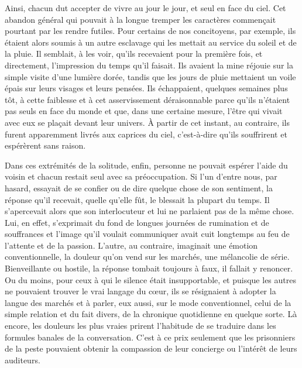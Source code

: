 \documentclass[french,twoside]{book} %
\begin{document}
Ainsi, chacun dut accepter de vivre au jour le jour, et seul en face du ciel. Cet abandon général qui pouvait à la longue tremper les caractères commençait pourtant par les rendre futiles. Pour certains de nos concitoyens, par exemple, ils étaient alors soumis à un autre esclavage qui les mettait au service du soleil et de la pluie. Il semblait, à les voir, qu’ils recevaient pour la première fois, et directement, l’impression du temps qu’il faisait. Ils avaient la mine réjouie sur la simple visite d’une lumière dorée, tandis que les jours de pluie mettaient un voile épais sur leurs visages et leurs pensées. Ils échappaient, quelques semaines plus tôt, à cette faiblesse et à cet asservissement déraisonnable parce qu’ils n’étaient pas seuls en face du monde et que, dans une certaine mesure, l’être qui vivait avec eux se plaçait devant leur univers. À partir de cet instant, au contraire, ils furent apparemment livrés aux caprices du ciel, c’est-à-dire qu’ils souffrirent et espérèrent sans raison.\par
Dans ces extrémités de la solitude, enfin, personne ne pouvait espérer l’aide du voisin et chacun restait seul avec sa préoccupation. Si l’un d’entre nous, par hasard, essayait de se confier ou de dire quelque chose de son sentiment, la réponse qu’il recevait, quelle qu’elle fût, le blessait la plupart du temps. Il s’apercevait alors que son interlocuteur et lui ne parlaient pas de la même chose. Lui, en effet, s’exprimait du fond de longues journées de rumination et de souffrances et l’image qu’il voulait communiquer avait cuit longtemps au feu de l’attente et de la passion. L’autre, au contraire, imaginait une émotion conventionnelle, la douleur qu’on vend sur les marchés, une mélancolie de série. Bienveillante ou hostile, la réponse tombait toujours à faux, il fallait y renoncer. Ou du moins, pour ceux à qui le silence était insupportable, et puisque les autres ne pouvaient trouver le vrai langage du cœur, ils se résignaient à adopter la langue des marchés et à parler, eux aussi, sur le mode conventionnel, celui de la simple relation et du fait divers, de la chronique quotidienne en quelque sorte. Là encore, les douleurs les plus vraies prirent l’habitude de se traduire dans les formules banales de la conversation. C’est à ce prix seulement que les prisonniers de la peste pouvaient obtenir la compassion de leur concierge ou l’intérêt de leurs auditeurs.\par
\end{document}
